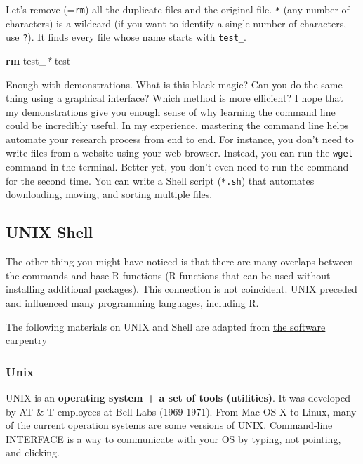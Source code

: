 \documentclass[
]{book}
\newenvironment{Shaded}{\begin{snugshade}}{\end{snugshade}}
\newcommand{\FunctionTok}[1]{\textcolor[rgb]{0.13,0.29,0.53}{\textbf{#1}}}
\newcommand{\NormalTok}[1]{#1}
\newcommand{\PreprocessorTok}[1]{\textcolor[rgb]{0.56,0.35,0.01}{\textit{#1}}}
\begin{document}
Let's remove (=\texttt{rm}) all the duplicate files and the original file. \texttt{*} (any number of characters) is a wildcard (if you want to identify a single number of characters, use \texttt{?}). It finds every file whose name starts with \texttt{test\_}.

\begin{Shaded}
\begin{Highlighting}[]
\FunctionTok{rm}\NormalTok{ test\_}\PreprocessorTok{*}\NormalTok{ test}
\end{Highlighting}
\end{Shaded}

Enough with demonstrations. What is this black magic? Can you do the same thing using a graphical interface? Which method is more efficient? I hope that my demonstrations give you enough sense of why learning the command line could be incredibly useful. In my experience, mastering the command line helps automate your research process from end to end. For instance, you don't need to write files from a website using your web browser. Instead, you can run the \texttt{wget} command in the terminal. Better yet, you don't even need to run the command for the second time. You can write a Shell script (\texttt{*.sh}) that automates downloading, moving, and sorting multiple files.

\subsection{UNIX Shell}\label{unix-shell}

The other thing you might have noticed is that there are many overlaps between the commands and base R functions (R functions that can be used without installing additional packages). This connection is not coincident. UNIX preceded and influenced many programming languages, including R.

The following materials on UNIX and Shell are adapted from \href{https://bids.github.io/2015-06-04-berkeley/shell/00-intro.html}{the software carpentry}

\subsubsection{Unix}\label{unix}

UNIX is an \textbf{operating system + a set of tools (utilities)}. It was developed by AT \& T employees at Bell Labs (1969-1971). From Mac OS X to Linux, many of the current operation systems are some versions of UNIX. Command-line INTERFACE is a way to communicate with your OS by typing, not pointing, and clicking.
\end{document}
